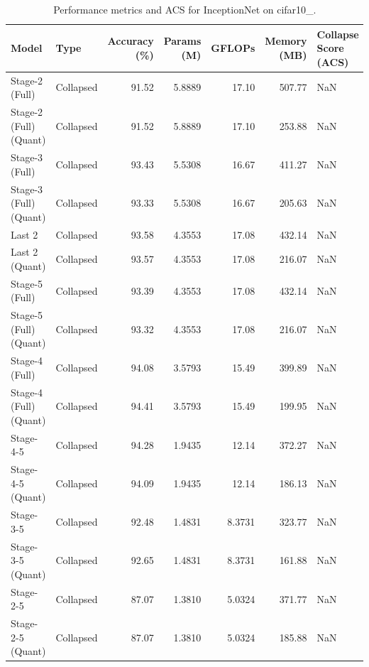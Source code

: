 \begin{table}
\caption{Performance metrics and ACS for InceptionNet on cifar10_.}
\label{tab:InceptionNet_cifar10_}
\begin{tabular}{llrrrrl}
\toprule
Model & Type & Accuracy (\%) & Params (M) & GFLOPs & Memory (MB) & Collapse Score (ACS) \\
\midrule
Stage-2 (Full) & Collapsed & 91.52 & 5.8889 & 17.10 & 507.77 & NaN \\
Stage-2 (Full)
(Quant) & Collapsed & 91.52 & 5.8889 & 17.10 & 253.88 & NaN \\
Stage-3 (Full) & Collapsed & 93.43 & 5.5308 & 16.67 & 411.27 & NaN \\
Stage-3 (Full)
(Quant) & Collapsed & 93.33 & 5.5308 & 16.67 & 205.63 & NaN \\
Last 2 & Collapsed & 93.58 & 4.3553 & 17.08 & 432.14 & NaN \\
Last 2
(Quant) & Collapsed & 93.57 & 4.3553 & 17.08 & 216.07 & NaN \\
Stage-5 (Full) & Collapsed & 93.39 & 4.3553 & 17.08 & 432.14 & NaN \\
Stage-5 (Full)
(Quant) & Collapsed & 93.32 & 4.3553 & 17.08 & 216.07 & NaN \\
Stage-4 (Full) & Collapsed & 94.08 & 3.5793 & 15.49 & 399.89 & NaN \\
Stage-4 (Full)
(Quant) & Collapsed & 94.41 & 3.5793 & 15.49 & 199.95 & NaN \\
Stage-4-5 & Collapsed & 94.28 & 1.9435 & 12.14 & 372.27 & NaN \\
Stage-4-5
(Quant) & Collapsed & 94.09 & 1.9435 & 12.14 & 186.13 & NaN \\
Stage-3-5 & Collapsed & 92.48 & 1.4831 & 8.3731 & 323.77 & NaN \\
Stage-3-5
(Quant) & Collapsed & 92.65 & 1.4831 & 8.3731 & 161.88 & NaN \\
Stage-2-5 & Collapsed & 87.07 & 1.3810 & 5.0324 & 371.77 & NaN \\
Stage-2-5
(Quant) & Collapsed & 87.07 & 1.3810 & 5.0324 & 185.88 & NaN \\
\bottomrule
\end{tabular}
\end{table}

